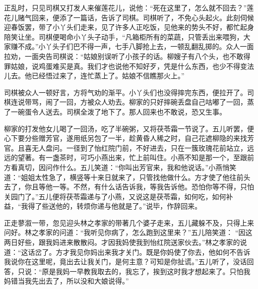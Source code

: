 \begin{parag}
    正乱时，只见司棋又打发人来催莲花儿，说他：“死在这里了，怎么就不回去？”莲花儿赌气回来，便添了一篇话，告诉了司棋。司棋听了，不免心头起火。此刻伺候迎春饭罢，带了小丫头们走来，见了许多人正吃饭，见他来的势头不好，都忙起身陪笑让坐。司棋便喝命小丫头子动手，“凡箱柜所有的菜蔬，只管丢出来喂狗，大家赚不成。”小丫头子们巴不得一声，七手八脚抢上去，一顿乱翻乱掷的。众人一面拉劝，一面央告司棋说：“姑娘别误听了小孩子的话。柳嫂子有八个头，也不敢得罪姑娘，说鸡蛋难买是真。我们才也说他不知好歹，凭是什么东西，也少不得变法儿去。他已经悟过来了，连忙蒸上了。姑娘不信瞧那火上。”
\end{parag}


\begin{parag}
    司棋被众人一顿好言，方将气劝的渐平。小丫头们也没得摔完东西，便拉开了。司棋连说带骂，闹了一回，方被众人劝去。柳家的只好摔碗丢盘自己咕嘟了一回，蒸了一碗蛋令人送去。司棋全泼了地下了。那人回来也不敢说，恐又生事。
\end{parag}


\begin{parag}
    柳家的打发他女儿喝了一回汤，吃了半碗粥，又将茯苓霜一节说了。五儿听罢，便心下要分些赠芳官，遂用纸另包了一半，趁黄昏人稀之时，自己花遮柳隐的来找芳官。且喜无人盘问。一径到了怡红院门前，不好进去，只在一簇玫瑰花前站立，远远的望著。有一盏茶时，可巧小燕出来，忙上前叫住。小燕不知是那一个，至跟前方看真切，因问作什么。五儿笑道：“你叫出芳官来，我和他说话。”小燕悄笑道：“姐姐太性急了，横竖等十来日就来了，只管找他做什么。方才使了他往前头去了，你且等他一等。不然，有什么话告诉我，等我告诉他。恐怕你等不得，只怕关园门了。”五儿便将茯苓霜递与了小燕，又说这是茯苓霜，如何吃，如何补益，“我得了些送他的，转烦你递与他就是了。”说毕，作辞回来。
\end{parag}


\begin{parag}
    正走蓼溆一带，忽见迎头林之孝家的带著几个婆子走来，五儿藏躲不及，只得上来问好。林之孝家的问道：“我听见你病了，怎么跑到这里来？”五儿陪笑道： “因这两日好些，跟我妈进来散散闷。才因我妈使我到怡红院送家伙去。”林之孝家的说道：“这话岔了。方才我见你妈出来我才关门。既是你妈使了你去，他如何不告诉我说你在这里呢，竟出去让我关门，是何主意？可知是你扯谎。”五儿听了，没话回答，只说：“原是我妈一早教我取去的，我忘了，挨到这时我才想起来了。只怕我妈错当我先出去了，所以没和大娘说得。”
\end{parag}


